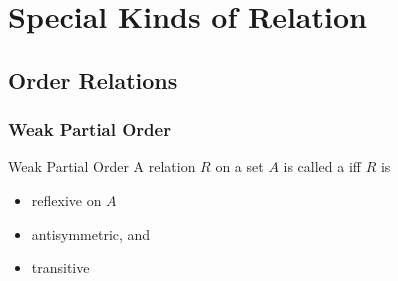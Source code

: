 \documentclass[\main/notes.tex]{subfiles}
\begin{document}
	\ifSubfilesClassLoaded{\setcounter{chapter}{5}}{}
	\chapter{Special Kinds of Relation}
		\section{Order Relations}
			\subsection{Weak Partial Order}
				\begin{definition}[width=0.68\textwidth]{Weak Partial Order}
					A relation $R$ on a set $A$ is called a  iff $R$ is
					\begin{itemize}[nosep]
						\item reflexive on $A$
						\item antisymmetric, and
						\item transitive
					\end{itemize}
				\end{definition}
\end{document}

